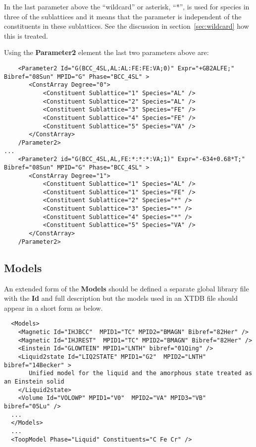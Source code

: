 \documentclass{article}
\begin{document}
\begin{appendices}
In the last parameter above the ``wildcard'' or asterisk, ``*'', is
used for species in three of the sublattices and it means that the
parameter is independent of the constituents in these sublattices.
See the discussion in section~\ref{sec:wildcard} how this is treated.


\newpage 

Using the {\bf Parameter2} element the last two parameters above are:

{\small
\begin{verbatim}
    <Parameter2 Id="G(BCC_4SL,AL:AL:FE:FE:VA;0)" Expr="+GB2ALFE;" Bibref="08Sun" MPID="G" Phase="BCC_4SL" >
       <ConstArray Degree="0">
           <Constituent Sublattice="1" Species="AL" />
           <Constituent Sublattice="2" Species="AL" />
           <Constituent Sublattice="3" Species="FE" />
           <Constituent Sublattice="4" Species="FE" />
           <Constituent Sublattice="5" Species="VA" />
       </ConstArray>
    /Parameter2>
...
    <Parameter2 id="G(BCC_4SL,AL,FE:*:*:*:VA;1)" Expr="-634+0.68*T;" Bibref="08Sun" MPID="G" Phase="BCC_4SL" >
       <ConstArray Degree="1">
           <Constituent Sublattice="1" Species="AL" />
           <Constituent Sublattice="1" Species="FE" />
           <Constituent Sublattice="2" Species="*" />
           <Constituent Sublattice="3" Species="*" />
           <Constituent Sublattice="4" Species="*" />
           <Constituent Sublattice="5" Species="VA" />
       </ConstArray>
    /Parameter2>
\end{verbatim}
}


\newpage 

\subsection{Models}\label{sec:modelex}

An extended form of the {\bf Models} should be defined a separate
global library file with the {\bf Id} and full description but the
models used in an XTDB file should appear in a short form as below.

{\small
\begin{verbatim}
  <Models>
    <Magnetic Id="IHJBCC"  MPID1="TC" MPID2="BMAGN" Bibref="82Her" />
    <Magnetic Id="IHJREST"  MPID1="TC" MPID2="BMAGN" Bibref="82Her" />
    <Einstein Id="GLOWTEIN" MPID1="LNTH" bibref="01Qing" /> 
    <Liquid2state Id="LIQ2STATE" MPID1="G2"  MPID2="LNTH" bibref="14Becker" >
       Unified model for the liquid and the amorphous state treated as an Einstein solid
    </Liquid2state>
    <Volume Id="VOLOWP" MPID1="V0"  MPID2="VA" MPID3="VB" bibref="05Lu" />
  ...
  </Models>
  ...
  <ToopModel Phase="Liquid" Constituents="C Fe Cr" />
\end{verbatim}
}


\end{appendices}
\end{document}
